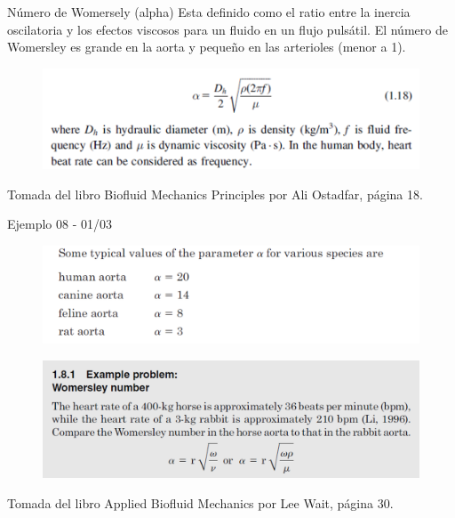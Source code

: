 \begin{frame}{Número de Womersely (alpha)}
\justifying
Esta definido como el ratio entre la inercia oscilatoria y los efectos viscosos para un fluido en un flujo pulsátil. El número de Womersley es grande en la aorta y pequeño en las arterioles (menor a 1).
\begin{figure}[H]
\centering
\includegraphics[scale=0.4]{Section_Files/picmanuel/41.png}
\label{fig: Figura2-34}
\end{figure}
{\tiny Tomada del libro Biofluid Mechanics Principles por Ali Ostadfar, página 18.}
\end{frame}

\begin{frame}{Ejemplo 08 - 01/03}
\justifying
\begin{figure}[H]
\centering
\includegraphics[scale=0.4]{Section_Files/picmanuel/42.png}
\label{fig: Figura2-35}
\end{figure}
\begin{figure}[H]
\centering
\includegraphics[scale=0.2]{Section_Files/picmanuel/43.png}
\label{fig: Figura2-36}
\end{figure}
{\tiny Tomada del libro Applied Biofluid Mechanics por Lee Wait, página 30.}
\end{frame}


